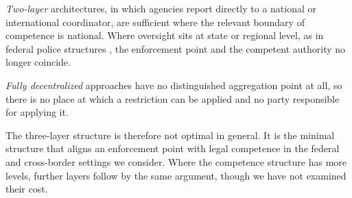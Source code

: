 \emph{Two-layer} architectures, in which agencies report directly to a national or international coordinator, are sufficient where the relevant boundary of competence is national. Where oversight sits at state or regional level, as in federal police structures \citep{buerger2023}, the enforcement point and the competent authority no longer coincide.

\emph{Fully decentralized} approaches have no distinguished aggregation point at all, so there is no place at which a restriction can be applied and no party responsible for applying it.

The three-layer structure is therefore not optimal in general. It is the minimal structure that aligns an enforcement point with legal competence in the federal and cross-border settings we consider. Where the competence structure has more levels, further layers follow by the same argument, though we have not examined their cost.